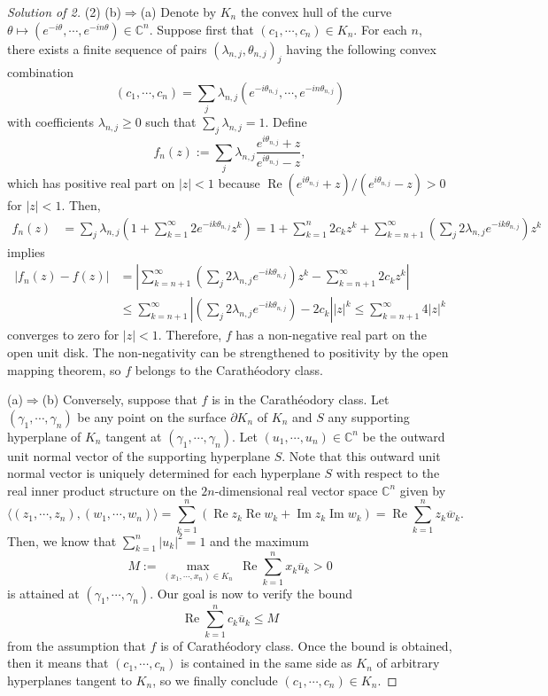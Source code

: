 \documentclass[a4paper]{article}
\theoremstyle{definition}
\renewcommand{\Re}{\operatorname{Re}}
\renewcommand{\Im}{\operatorname{Im}}
\newcommand{\C}{\mathbb{C}}
\renewcommand{\bar}{\overline}
\begin{document}
\begin{proof}[Solution of 2]
(2)
(b)$\Rightarrow$(a)
Denote by $K_n$ the convex hull of the curve $\theta\mapsto(e^{-i\theta},\cdots,e^{-in\theta})\in\C^n$.
Suppose first that $(c_1,\cdots,c_n)\in K_n$.
For each $n$, there exists a finite sequence of pairs $(\lambda_{n,j},\theta_{n,j})_j$ having the following convex combination
\[(c_1,\cdots,c_n)=\sum_j\lambda_{n,j}(e^{-i\theta_{n,j}},\cdots,e^{-in\theta_{n,j}})\]
with coefficients $\lambda_{n,j}\ge0$ such that $\sum_j\lambda_{n,j}=1$.
Define
\[f_n(z):=\sum_j\lambda_{n,j}\frac{e^{i\theta_{n,j}}+z}{e^{i\theta_{n,j}}-z},\]
which has positive real part on $|z|<1$ because $\Re(e^{i\theta_{n,j}}+z)/(e^{i\theta_{n,j}}-z)>0$ for $|z|<1$.
Then,
\begin{align*}
f_n(z)
&=\sum_j\lambda_{n,j}(1+\sum_{k=1}^\infty2e^{-ik\theta_{n,j}}z^k)=1+\sum_{k=1}^n2c_kz^k+\sum_{k=n+1}^\infty\left(\sum_j2\lambda_{n,j}e^{-ik\theta_{n,j}}\right)z^k
\end{align*}
implies
\begin{align*}
|f_n(z)-f(z)|
&=\left|\sum_{k=n+1}^\infty\left(\sum_j2\lambda_{n,j}e^{-ik\theta_{n,j}}\right)z^k-\sum_{k=n+1}^\infty2c_kz^k\right|\\
&\le\sum_{k=n+1}^\infty\left|\left(\sum_j2\lambda_{n,j}e^{-ik\theta_{n,j}}\right)-2c_k\right||z|^k\le\sum_{k=n+1}^\infty4|z|^k
\end{align*}
converges to zero for $|z|<1$.
Therefore, $f$ has a non-negative real part on the open unit disk.
The non-negativity can be strengthened to positivity by the open mapping theorem, so $f$ belongs to the Carath\'eodory class.

(a)$\Rightarrow$(b)
Conversely, suppose that $f$ is in the Carath\'eodory class.
Let $(\gamma_1,\cdots,\gamma_n)$ be any point on the surface $\partial K_n$ of $K_n$ and $S$ any supporting hyperplane of $K_n$ tangent at $(\gamma_1,\cdots,\gamma_n)$.
Let $(u_1,\cdots,u_n)\in\C^n$ be the outward unit normal vector of the supporting hyperplane $S$.
Note that this outward unit normal vector is uniquely determined for each hyperplane $S$ with respect to the real inner product structure on the $2n$-dimensional real vector space $\C^n$ given by
\[\langle(z_1,\cdots,z_n),(w_1,\cdots,w_n)\rangle=\sum_{k=1}^n(\Re z_k\Re w_k+\Im z_k\Im w_k)=\Re\sum_{k=1}^nz_k\bar w_k.\]
Then, we know that $\sum_{k=1}^n|u_k|^2=1$ and the maximum
\[M:=\max_{(x_1,\cdots,x_n)\in K_n}\ \Re\sum_{k=1}^nx_k\bar u_k>0\]
is attained at $(\gamma_1,\cdots,\gamma_n)$.
Our goal is now to verify the bound
\[\Re\sum_{k=1}^nc_k\bar u_k\le M\]
from the assumption that $f$ is of Carath\'eodory class.
Once the bound is obtained, then it means that $(c_1,\cdots,c_n)$ is contained in the same side as $K_n$ of arbitrary hyperplanes tangent to $K_n$, so we finally conclude $(c_1,\cdots,c_n)\in K_n$.


\end{proof}
\end{document}
